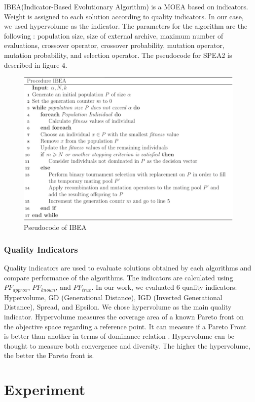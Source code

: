 \documentclass[a4paper,12pt]{article}
\begin{document}
IBEA(Indicator-Based Evolutionary Algorithm) is a MOEA based on indicators. Weight is assigned to each solution according to quality indicators. In our case, we used hypervolume as the indicator. The parameters for the algorithm are the following : population size, size of external archive, maximum number of evaluations, crossover operator, crossover probability, mutation operator, mutation probability, and selection operator.
The pseudocode for SPEA2 is described in figure 4. 

\begin{figure}[h!]
\centering
\includegraphics[width=.7\linewidth]{Images/IBEA.png}
\caption{Pseudocode of IBEA}
\label{fig:computerNo}
\end{figure}





\subsubsection{Quality Indicators}

Quality indicators are used to evaluate solutions obtained by each algorithms and compare performance of the algorithms. The indicators are calculated using $PF_{approx}$, $PF_{known}$, and $PF_{true}$. In our work, we evaluated 6 quality indicators: Hypervolume, GD (Generational Distance), IGD (Inverted Generational Distance), Spread, and Epsilon.  
We chose hypervolume as the main quality indicator. Hypervolume measures the coverage area of a known Pareto front on the objective space regarding a reference point. It can measure if a Pareto Front is better than another in terms of dominance relation \cite{1197687}. Hypervolume can be thought to measure both convergence and diversity. The higher the hypervolume, the better the Pareto front is. 

\section{Experiment}
\end{document}
